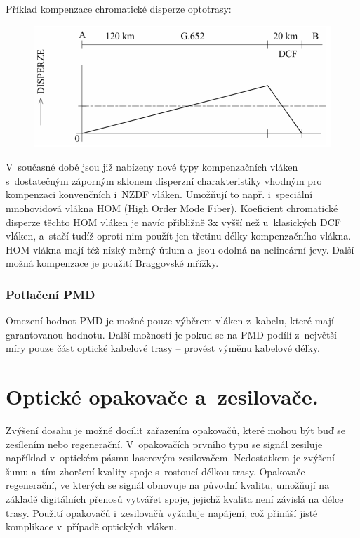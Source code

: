 Příklad kompenzace chromatické disperze optotrasy:
\begin{figure}[!ht]
  \begin{center}
    \includegraphics[scale=1]{obrazky/chromkomp.png}
  \end{center}
\end{figure}

V~současné době jsou již nabízeny nové typy kompenzačních vláken s~dostatečným záporným sklonem disperzní charakteristiky vhodným pro kompenzaci konvenčních i~NZDF vláken. Umožňují to např. i~speciální mnohovidová vlákna HOM (High Order Mode Fiber). Koeficient chromatické disperze těchto HOM vláken je navíc přibližně 3x vyšší než u~klasických DCF vláken, a~stačí tudíž oproti nim použít jen třetinu délky kompenzačního vlákna. HOM vlákna mají též nízký měrný útlum a~jsou odolná na nelineární jevy. Další možná kompenzace je použití Braggovské mřížky.

\subsubsection{Potlačení PMD}
Omezení hodnot PMD je možné pouze výběrem vláken z~kabelu, které mají garantovanou hodnotu. Další možností je pokud se na PMD podílí z~největší míry pouze část optické kabelové trasy – provést výměnu kabelové délky.

\clearpage
\section{Optické opakovače a~zesilovače.}
Zvýšení dosahu je možné docílit zařazením opakovačů, které mohou být buď se zesílením nebo regenerační. V~opakovačích prvního typu se signál zesiluje například v~optickém pásmu laserovým zesilovačem. Nedostatkem je zvýšení šumu a~tím zhoršení kvality spoje s~rostoucí délkou trasy. Opakovače regenerační, ve kterých se signál obnovuje na původní kvalitu, umožňují na základě digitálních přenosů vytvářet spoje, jejichž kvalita není závislá na délce trasy. Použití opakovačů i~zesilovačů vyžaduje napájení, což přináší jisté komplikace v~případě optických vláken.

